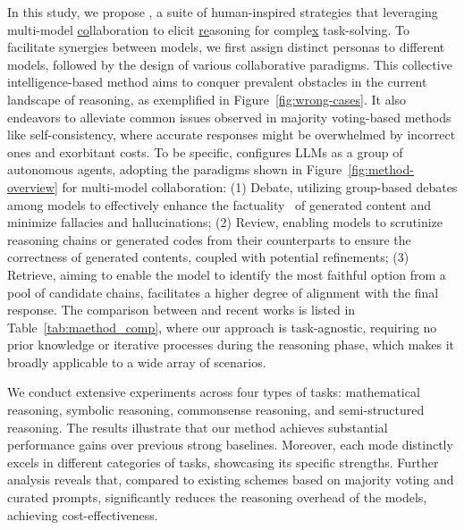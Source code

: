 In this study, 
we propose \ours, 
a suite of human-inspired strategies that leveraging multi-model \underline{co}llaboration to elicit \underline{re}asoning for comple\underline{x} task-solving. %
To facilitate synergies between models, 
we first assign distinct personas to different models, 
followed by the design of various collaborative paradigms. 
This collective intelligence-based method aims to conquer prevalent obstacles in the current landscape of reasoning,
as exemplified in Figure~\ref{fig:wrong-cases}.
It also endeavors to alleviate common issues observed in majority voting-based methods like self-consistency, 
where accurate responses might be overwhelmed by incorrect ones and exorbitant costs.
To be specific, \ours configures LLMs as a group of autonomous agents,
adopting the paradigms shown in Figure~\ref{fig:method-overview} for multi-model collaboration:
(1) Debate, utilizing group-based debates among models to effectively enhance the factuality~\citep{du2023improving} of generated content and minimize fallacies and hallucinations; 
(2) Review, enabling models to scrutinize reasoning chains or generated codes from their counterparts to ensure the correctness of generated contents, 
coupled with potential refinements; 
(3) Retrieve, aiming to enable the model to identify the most faithful option from a pool of candidate chains, facilitates a higher degree of alignment with the final response.
The comparison between \ours and recent works is listed in Table~\ref{tab:maethod_comp},
where our approach is task-agnostic,
requiring no prior knowledge or iterative processes during the reasoning phase,
which makes it broadly applicable to a wide array of scenarios.

We conduct extensive experiments across four types of tasks: mathematical reasoning, symbolic reasoning, commonsense reasoning, 
and semi-structured reasoning. 
The results illustrate that our method achieves substantial performance gains over previous strong baselines. 
Moreover, each mode distinctly excels in different categories of tasks, 
showcasing its specific strengths.
Further analysis reveals that, 
compared to existing schemes based on majority voting and curated prompts,
\ours significantly reduces the reasoning overhead of the models, 
achieving cost-effectiveness.


